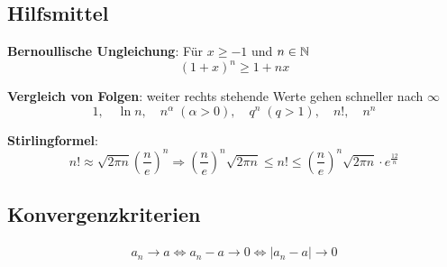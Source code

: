 \subsection{Hilfsmittel}
\textbf{Bernoullische Ungleichung}: Für $x \geq -1$ und $n \in \mathbb{N}$
\[
	(1+x)^n \geq 1 + nx
\]


\textbf{Vergleich von Folgen}: weiter rechts stehende Werte gehen schneller nach
$\infty$
\[
	1, \quad \ln n, \quad n^\alpha \; (\alpha > 0), \quad q^n \; (q > 1), \quad n!,
	\quad n^n
\]

\textbf{Stirlingformel}:
\[
	n! \approx \sqrt{2 \pi n} \left (\frac{n}{e} \right )^n
	\Rightarrow \left ( \frac{n}{e} \right )^n \sqrt{2 \pi n} \leq n! \leq \left (
	\frac{n}{e} \right )^n \sqrt{2 \pi n} \cdot e^\frac{12}{n}
\]

\subsection{Konvergenzkriterien}
\begin{align*}
	a_n \to a \Leftrightarrow a_n - a \to 0 \Leftrightarrow |a_n - a| \to 0
\end{align*}
	
